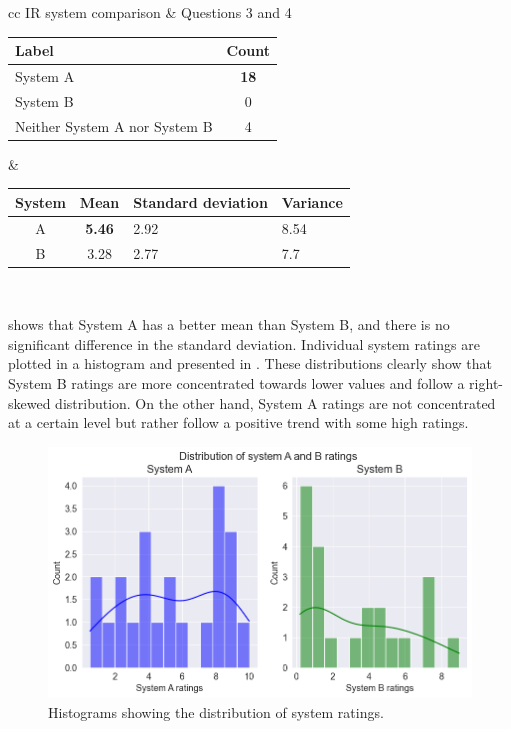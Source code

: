 \begin{center}
	\label{tab:question_2_results}
	\begin{tabular}{ cc }   %
		IR system comparison  & Questions 3 and 4 \\  
\begin{tabularx}{.4\textwidth}{|Y|c|}
	\hline
	Label & Count \\
	\hline
	System A & \textbf{18} \\
	\hline
	System B & 0 \\
	\hline
	Neither System A nor System B & 4 \\
	\hline
	
\end{tabularx} &  %
		\begin{tabularx}{.45\textwidth}{|c|c|Y|Y|}
			\hline
			System & Mean & Standard deviation & Variance \\
			\hline
			 A & \textbf{5.46} & 2.92  & 8.54 \\
			\hline
			 B & 3.28 & 2.77 & 7.7 \\
			\hline

		\end{tabularx} \\
	\end{tabular}
\end{center}

 shows that System A has a better mean than System B, and there is no significant difference in the standard deviation. Individual system ratings are plotted in a histogram and presented in . These distributions clearly show that System B ratings are more concentrated towards lower values and follow a right-skewed distribution. On the other hand, System A ratings are not concentrated at a certain level but rather follow a positive trend with some high ratings.

\begin{figure}[h]
	\centering
	\includegraphics[width=.99\textwidth]{images/subplots/rating_histograms.png}
	\caption{Histograms showing the distribution of system ratings.  \label{fig:histograms}}
\end{figure}



